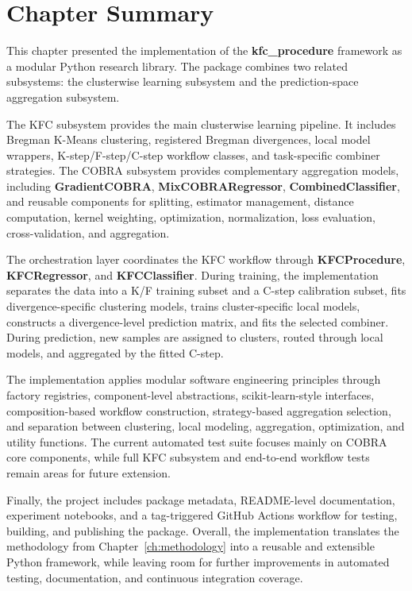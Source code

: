 \section{Chapter Summary}
\label{sec:chapter_summary}

\hs This chapter presented the implementation of the \textbf{kfc\_procedure} framework as a modular Python research library. The package combines two related subsystems: the \KFCProcedure{} clusterwise learning subsystem and the \GradientCOBRA{} prediction-space aggregation subsystem.

The KFC subsystem provides the main clusterwise learning pipeline. It includes Bregman K-Means clustering, registered Bregman divergences, local model wrappers, K-step/F-step/C-step workflow classes, and task-specific combiner strategies. The COBRA subsystem provides complementary aggregation models, including \textbf{GradientCOBRA}, \textbf{MixCOBRARegressor}, \textbf{CombinedClassifier}, and reusable components for splitting, estimator management, distance computation, kernel weighting, optimization, normalization, loss evaluation, cross-validation, and aggregation.

The orchestration layer coordinates the KFC workflow through \textbf{KFCProcedure}, \textbf{KFCRegressor}, and \textbf{KFCClassifier}. During training, the implementation separates the data into a K/F training subset and a C-step calibration subset, fits divergence-specific clustering models, trains cluster-specific local models, constructs a divergence-level prediction matrix, and fits the selected combiner. During prediction, new samples are assigned to clusters, routed through local models, and aggregated by the fitted C-step.

The implementation applies modular software engineering principles through factory registries, component-level abstractions, scikit-learn-style interfaces, composition-based workflow construction, strategy-based aggregation selection, and separation between clustering, local modeling, aggregation, optimization, and utility functions. The current automated test suite focuses mainly on COBRA core components, while full KFC subsystem and end-to-end workflow tests remain areas for future extension.

Finally, the project includes package metadata, README-level documentation, experiment notebooks, and a tag-triggered GitHub Actions workflow for testing, building, and publishing the package. Overall, the implementation translates the methodology from Chapter~\ref{ch:methodology} into a reusable and extensible Python framework, while leaving room for further improvements in automated testing, documentation, and continuous integration coverage.

